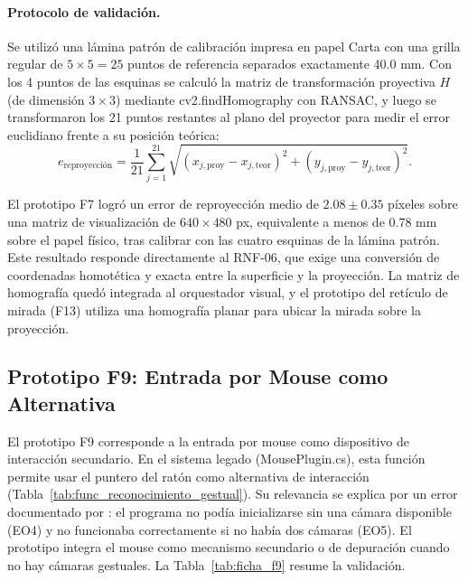 \paragraph{Protocolo de validación.} Se utilizó una lámina patrón de calibración impresa en papel Carta con una grilla regular de $5 \times 5 = 25$ puntos de referencia separados exactamente 40.0 mm. Con los 4 puntos de las esquinas se calculó la matriz de transformación proyectiva $H$ (de dimensión $3 \times 3$) mediante cv2.findHomography con RANSAC, y luego se transformaron los 21 puntos restantes al plano del proyector para medir el error euclidiano frente a su posición teórica:
\[ e_{\mathrm{reproyección}} = \frac{1}{21} \sum_{j=1}^{21} \sqrt{(x_{j,\mathrm{proy}} - x_{j,\mathrm{teor}})^2 + (y_{j,\mathrm{proy}} - y_{j,\mathrm{teor}})^2}. \]
 
El prototipo F7 logró un error de reproyección medio de $2.08 \pm 0.35$ píxeles sobre una matriz de visualización de $640 \times 480$ px, equivalente a menos de 0.78 mm sobre el papel físico, tras calibrar con las cuatro esquinas de la lámina patrón. Este resultado responde directamente al RNF-06, que exige una conversión de coordenadas homotética y exacta entre la superficie y la proyección. La matriz de homografía quedó integrada al orquestador visual, y el prototipo del retículo de mirada (F13) utiliza una homografía planar para ubicar la mirada sobre la proyección.
 
\subsection{Prototipo F9: Entrada por Mouse como Alternativa}
 
El prototipo F9 corresponde a la entrada por mouse como dispositivo de interacción secundario. En el sistema legado (MousePlugin.cs), esta función permite usar el puntero del ratón como alternativa de interacción (Tabla~\ref{tab:func_reconocimiento_gestual}). Su relevancia se explica por un error documentado por \cite{ibaceta2023evaluacion}: el programa no podía inicializarse sin una cámara disponible (EO4) y no funcionaba correctamente si no había dos cámaras (EO5). El prototipo integra el mouse como mecanismo secundario o de depuración cuando no hay cámaras gestuales. La Tabla~\ref{tab:ficha_f9} resume la validación.
 
